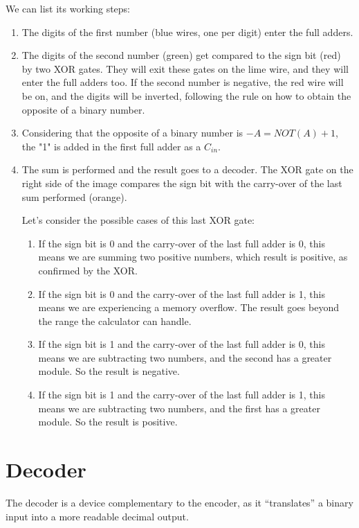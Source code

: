 \documentclass{article}
\begin{document}
We can list its working steps:
\begin{enumerate}
  \item The digits of the first number (blue wires, one per digit) enter the full adders.
  \item The digits of the second number (green) get compared to the sign bit (red) by two XOR gates. They will exit these gates on the lime wire, and they will enter the full adders too. If the second number is negative, the red wire will be on, and the digits will be inverted, following the rule on how to obtain the opposite of a binary number.
  \item Considering that the opposite of a binary number is $-A=NOT(A)+1$, the "1" is added in the first full adder as a $C_{in}$.
  \item The sum is performed and the result goes to a decoder. The XOR gate on the right side of the image compares the sign bit with the carry-over of the last sum performed (orange). 
  
    \vspace{3mm}

    Let's consider the possible cases of this last XOR gate:
  \begin{enumerate}
    \item If the sign bit is 0 and the carry-over of the last full adder is 0, this means we are summing two positive numbers, which result is positive, as confirmed by the XOR.
    \item If the sign bit is 0 and the carry-over of the last full adder is 1, this means we are experiencing a memory overflow. The result goes beyond the range the calculator can handle.
    \item If the sign bit is 1 and the carry-over of the last full adder is 0, this means we are subtracting two numbers, and the second has a greater module. So the result is negative.
    \item If the sign bit is 1 and the carry-over of the last full adder is 1, this means we are subtracting two numbers, and the first has a greater module. So the result is positive.
  \end{enumerate}
\end{enumerate}

\section{Decoder}

The decoder is a device complementary to the encoder, as it ``translates'' a binary input into a more readable decimal output.
\end{document}
